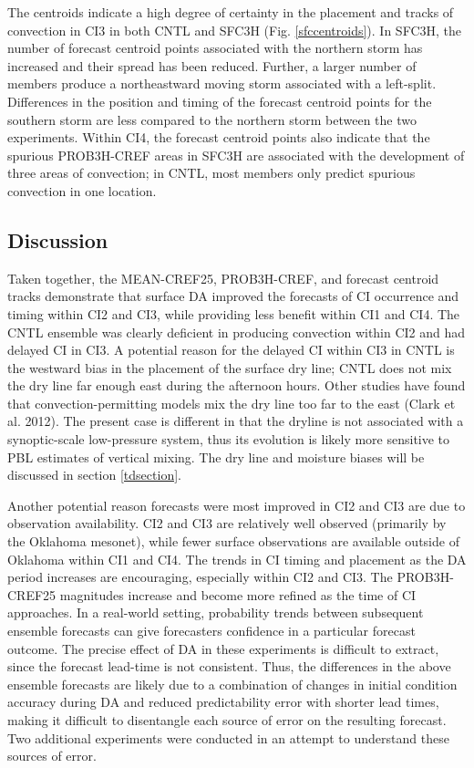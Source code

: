 The centroids indicate a high degree of certainty in the placement and tracks of convection in CI3 in both CNTL and SFC3H (Fig. \ref{sfccentroids}). In SFC3H, the number of forecast centroid points associated with the northern storm has increased and their spread has been reduced. Further, a larger number of members produce a northeastward moving storm associated with a left-split. Differences in the position and timing of the forecast centroid points for the southern storm are less compared to the northern storm between the two experiments. Within CI4, the forecast centroid points also indicate that the spurious PROB3H-CREF areas in SFC3H are associated with the development of three areas of convection; in CNTL, most members only predict spurious convection in one location.

\subsection{Discussion} 
\label{sfcDA_diss}
Taken together, the MEAN-CREF25, PROB3H-CREF, and forecast centroid tracks demonstrate that surface DA improved the forecasts of CI occurrence and timing within CI2 and CI3, while providing less benefit within CI1 and CI4. The CNTL ensemble was clearly deficient in producing convection within CI2 and had delayed CI in CI3. A potential reason for the delayed CI within CI3 in CNTL is the westward bias in the placement of the surface dry line; CNTL does not mix the dry line far enough east during the afternoon hours. Other studies have found that convection-permitting models mix the dry line too far to the east (Clark et al. 2012). The present case is different in that the dryline is not associated with a synoptic-scale low-pressure system, thus its evolution is likely more sensitive to PBL estimates of vertical mixing. The dry line and moisture biases will be discussed in section \ref{tdsection}.

Another potential reason forecasts were most improved in CI2 and CI3 are due to observation availability. CI2 and CI3 are relatively well observed (primarily by the Oklahoma mesonet), while fewer surface observations are available outside of Oklahoma within CI1 and CI4. The trends in CI timing and placement as the DA period increases are encouraging, especially within CI2 and CI3. The PROB3H-CREF25 magnitudes increase and become more refined as the time of CI approaches. In a real-world setting, probability trends between subsequent ensemble forecasts can give forecasters confidence in a particular forecast outcome. The precise effect of DA in these experiments is difficult to extract, since the forecast lead-time is not consistent. Thus, the differences in the above ensemble forecasts are likely due to a combination of changes in initial condition accuracy during DA and reduced predictability error with shorter lead times, making it difficult to disentangle each source of error on the resulting forecast. Two additional experiments were conducted in an attempt to understand these sources of error.


